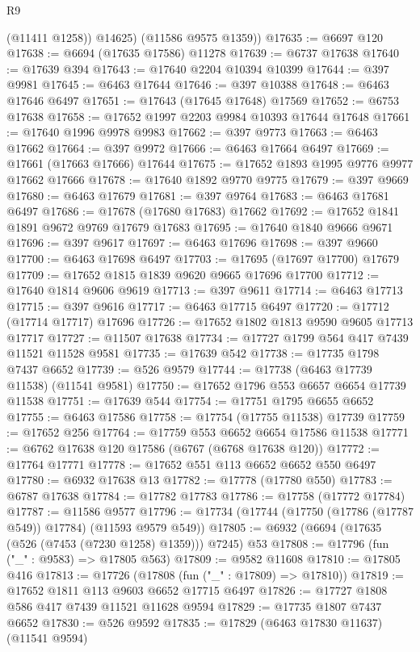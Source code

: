 \begin{lexlean}{R9}
\begin{coremodule}
          (@11411 @1258))
        @14625)
      (@11586 @9575 @1359))
@17635 := @6697 @120
@17638 := @6694 (@17635 @17586) @11278
@17639 := @6737 @17638
@17640 := @17639 @394
@17643 := @17640 @2204 @10394 @10399
@17644 := @397 @9981
@17645 := @6463 @17644
@17646 := @397 @10388
@17648 := @6463 @17646 @6497
@17651 := @17643 (@17645 @17648) @17569
@17652 := @6753 @17638
@17658 := @17652 @1997 @2203 @9984 @10393 @17644 @17648
@17661 := @17640 @1996 @9978 @9983
@17662 := @397 @9773
@17663 := @6463 @17662
@17664 := @397 @9972
@17666 := @6463 @17664 @6497
@17669 := @17661 (@17663 @17666) @17644
@17675 := @17652 @1893 @1995 @9776 @9977 @17662 @17666
@17678 := @17640 @1892 @9770 @9775
@17679 := @397 @9669
@17680 := @6463 @17679
@17681 := @397 @9764
@17683 := @6463 @17681 @6497
@17686 := @17678 (@17680 @17683) @17662
@17692 := @17652 @1841 @1891 @9672 @9769 @17679 @17683
@17695 := @17640 @1840 @9666 @9671
@17696 := @397 @9617
@17697 := @6463 @17696
@17698 := @397 @9660
@17700 := @6463 @17698 @6497
@17703 := @17695 (@17697 @17700) @17679
@17709 := @17652 @1815 @1839 @9620 @9665 @17696 @17700
@17712 := @17640 @1814 @9606 @9619
@17713 := @397 @9611
@17714 := @6463 @17713
@17715 := @397 @9616
@17717 := @6463 @17715 @6497
@17720 := @17712 (@17714 @17717) @17696
@17726 := @17652 @1802 @1813 @9590 @9605 @17713 @17717
@17727 := @11507 @17638
@17734 := @17727 @1799 @564 @417 @7439 @11521 @11528 @9581
@17735 := @17639 @542
@17738 := @17735 @1798 @7437 @6652
@17739 := @526 @9579
@17744 := @17738 (@6463 @17739 @11538) (@11541 @9581)
@17750 := @17652 @1796 @553 @6657 @6654 @17739 @11538
@17751 := @17639 @544
@17754 := @17751 @1795 @6655 @6652
@17755 := @6463 @17586
@17758 := @17754 (@17755 @11538) @17739
@17759 := @17652 @256
@17764 := @17759 @553 @6652 @6654 @17586 @11538
@17771 := @6762 @17638 @120 @17586 (@6767 (@6768 @17638 @120))
@17772 := @17764 @17771
@17778 := @17652 @551 @113 @6652 @6652 @550 @6497
@17780 := @6932 @17638 @13
@17782 := @17778 (@17780 @550)
@17783 := @6787 @17638
@17784 := @17782 @17783
@17786 := @17758 (@17772 @17784)
@17787 := @11586 @9577
@17796 := @17734 (@17744 (@17750 (@17786 (@17787 @549)) @17784) (@11593 @9579 @549))
@17805 := @6932 (@6694 (@17635 (@526 (@7453 (@7230 @1258) @1359))) @7245) @53
@17808 := @17796 (fun ("_" : @9583) => @17805 @563)
@17809 := @9582 @11608
@17810 := @17805 @416
@17813 := @17726 (@17808 (fun ("_" : @17809) => @17810))
@17819 := @17652 @1811 @113 @9603 @6652 @17715 @6497
@17826 := @17727 @1808 @586 @417 @7439 @11521 @11628 @9594
@17829 := @17735 @1807 @7437 @6652
@17830 := @526 @9592
@17835 := @17829 (@6463 @17830 @11637) (@11541 @9594)

\end{coremodule}
\end{lexlean}
